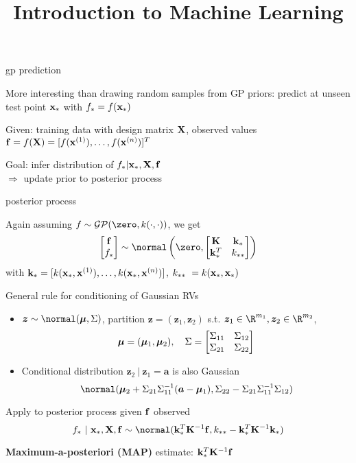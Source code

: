 \documentclass[11pt,compress,t,notes=noshow, xcolor=table]{beamer}
\title{Introduction to Machine Learning}
\begin{document}

\begin{framei}[sep=L]{gp prediction}
\item More interesting than drawing random samples from GP priors: predict at unseen test point $\xs$ with $f_\ast = f(\xs)$
\item Given: training data with design matrix $\Xmat$, observed values $\fv = f(\Xmat) = \fvec^T$
\item Goal: infer distribution of $f_\ast | \xs, \Xmat, \fv$ \\$\Rightarrow$ update prior to posterior process
\end{framei}

\begin{framei}[sep=M]{posterior process}
\item Again assuming $f \sim \GPzk$, we get
$$\begin{bmatrix}
\fv \\ f_\ast
\end{bmatrix} \sim  
\normal \left(\zero, \begin{bmatrix} \Kmat & \ks \\ \ks^T & \kss\end{bmatrix}\right)$$
with $\ks = [k(\xs, \xi[1]), \dots, k(\xs, \xi[n])]$,  $ \kss\ = k(\xs, \xs)$
\item General rule for conditioning of Gaussian RVs
\begin{itemize}
\item $\bm{z} \sim \normal(\muv, \Sigma)$, partition $\bm{z} = (\bm{z}_1, \bm{z}_2)$ s.t. $\bm{z}_1 \in \R^{m_1}, \bm{z}_2 \in \R^{m_2}$, $$\muv = (\muv_1, \muv_2), \quad \Sigma = \begin{bmatrix} \Sigma_{11} & \Sigma_{12} \\ \Sigma_{21} & \Sigma_{22} \end{bmatrix} $$
\item Conditional distribution $\bm{z}_2 ~|~ \bm{z}_1 = \bm{a}$ is also Gaussian 
$$\normal(\muv_2 + \Sigma_{21} \Sigma_{11}^{-1} (\bm{a} - \muv_1), \Sigma_{22} - \Sigma_{21}\Sigma_{11}^{-1} \Sigma_{12})$$
\end{itemize}
\item Apply to posterior process given $\fv$ observed $$f_* ~|~ \xs, \Xmat, \fv \sim \normal(\ks^{T}\Kinv\fv, \kss - \ks^T \Kmat ^{-1}\ks)$$
\item \textbf{Maximum-a-posteriori (MAP)} estimate: $\ks^{T}\Kinv\fv$
\end{framei}
\end{document}
